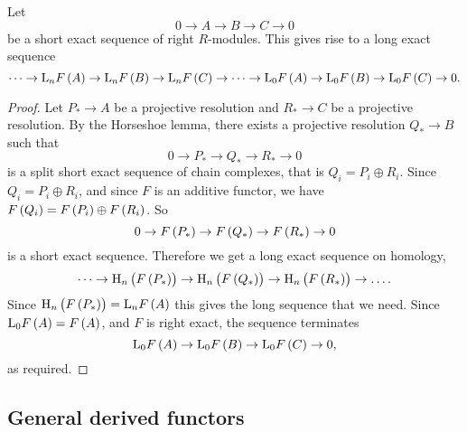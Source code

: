 
\begin{proposition}
Let
$$ 0 \to A \to B \to C \to 0 $$
be a short exact sequence of right $ R $-modules. This gives rise to a long exact sequence
$$ \dots \to \L_nF\br{A} \to \L_nF\br{B} \to \L_nF\br{C} \to \dots \to \L_0F\br{A} \to \L_0F\br{B} \to \L_0F\br{C} \to 0. $$
\end{proposition}

\begin{proof}
Let $ P_* \to A $ be a projective resolution and $ R_* \to C $ be a projective resolution. By the Horseshoe lemma, there exists a projective resolution $ Q_* \to B $ such that
$$ 0 \to P_* \to Q_* \to R_* \to 0 $$
is a split short exact sequence of chain complexes, that is $ Q_i = P_i \oplus R_i $. Since $ Q_i = P_i \oplus R_i $, and since $ F $ is an additive functor, we have $ F\br{Q_i} = F\br{P_i} \oplus F\br{R_i} $. So
$$ 0 \to F\br{P_*} \to F\br{Q_*} \to F\br{R_*} \to 0 $$
is a short exact sequence. Therefore we get a long exact sequence on homology,
$$ \dots \to \H_n\br{F\br{P_*}} \to \H_n\br{F\br{Q_*}} \to \H_n\br{F\br{R_*}} \to \dots. $$
Since $ \H_n\br{F\br{P_*}} = \L_nF\br{A} $ this gives the long sequence that we need. Since $ \L_0F\br{A} = F\br{A} $, and $ F $ is right exact, the sequence terminates
$$ \L_0F\br{A} \to \L_0F\br{B} \to \L_0F\br{C} \to 0, $$
as required.
\end{proof}

\subsection{General derived functors}

